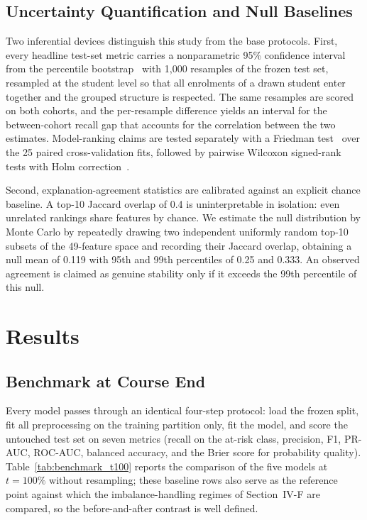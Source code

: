 \documentclass[conference]{IEEEtran}
\begin{document}
\subsection{Uncertainty Quantification and Null Baselines}

Two inferential devices distinguish this study from the base protocols.
First, every headline test-set metric carries a nonparametric 95\%
confidence interval from the percentile bootstrap~\cite{efron1993} with
1,000 resamples of the frozen test set, resampled at the student level so that all enrolments
of a drawn student enter together and the grouped structure is respected.
The same resamples are scored on both cohorts, and the per-resample
difference yields an interval for the between-cohort recall gap that
accounts for the correlation between the two estimates. Model-ranking claims
are tested separately with a Friedman test~\cite{demsar2006} over the 25
paired cross-validation fits, followed by pairwise Wilcoxon signed-rank
tests with Holm correction~\cite{holm1979}.

Second, explanation-agreement statistics are calibrated against an explicit
chance baseline. A top-10 Jaccard overlap of 0.4 is uninterpretable in
isolation: even unrelated rankings share features by chance. We estimate the
null distribution by Monte Carlo by repeatedly drawing two independent
uniformly random top-10 subsets of the 49-feature space and recording their
Jaccard overlap, obtaining a null mean of 0.119 with 95th and 99th
percentiles of 0.25 and 0.333. An observed agreement is
claimed as genuine stability only if it exceeds the 99th percentile of this
null.

\section{Results}

\subsection{Benchmark at Course End}

Every model passes through an identical four-step protocol: load the frozen
split, fit all preprocessing on the training partition only, fit the model,
and score the untouched test set on seven metrics (recall on the at-risk
class, precision, F1, PR-AUC, ROC-AUC, balanced accuracy, and the Brier
score for probability quality). Table~\ref{tab:benchmark_t100} reports the
comparison of the five models at $t=100\%$ without resampling; these
baseline rows also serve as the reference point against which the
imbalance-handling regimes of Section~IV-F are compared, so the
before-and-after contrast is well defined.
\end{document}

